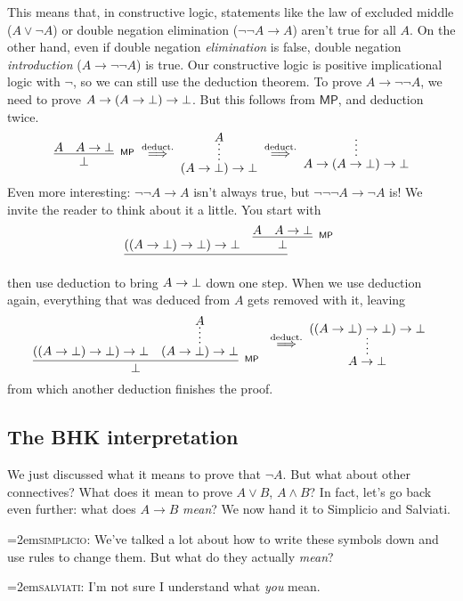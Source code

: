 \documentclass[11pt,paper=letter]{scrartcl}
\renewcommand{\sf}{\mathsf}
\renewcommand{\land}{\wedge}
\renewcommand{\lor}{\vee}
\renewcommand{\lnot}{\neg}
\newcommand{\vc}[1]{\vcenter{\hbox{#1}}}
\newcommand{\simp}{\vspace{0.5em}\noindent\hangindent=2em\textsc{simplicio:} }
\newcommand{\salv}{\vspace{0.5em}\noindent\hangindent=2em\textsc{salviati:} }
\begin{document}
This means that, in constructive logic, statements like the law of excluded middle ($A \lor \lnot A$) or double negation elimination ($\lnot \lnot A \to A$) aren't true for all $A$. On the other hand, even if double negation \emph{elimination} is false, double negation \emph{introduction} ($A \to \lnot\lnot A$) is true. Our constructive logic is positive implicational logic with $\lnot$, so we can still use the deduction theorem. To prove $A \to \lnot\lnot A$, we need to prove $A \to (A \to \bot) \to \bot$. But this follows from $\sf{MP}$, and deduction twice.
\begin{align*}
\vc{\infer[^\sf{MP}]
{\false}
{A & A \to \false}}
\;\overset{\text{deduct.}}{\implies}\;
\vc{\infer*
{(A \to \false) \to \false}
{A}}
\;\overset{\text{deduct.}}{\implies}\;
\vc{\infer*
{A \to (A \to \false) \to \false}
{}}
\end{align*}
Even more interesting: $\lnot\lnot A \to A$ isn't always true, but $\lnot\lnot\lnot A \to \lnot A$ is! We invite the reader to think about it a little. You start with
\begin{align*}
\vc{\infer
{\phantom{\false}}
{
((A \to \false) \to \false) \to \false
&
\infer[^\sf{MP}]
{\false}
{A & A \to \false}
}
}
\end{align*}
then use deduction to bring $A \to \bot$ down one step. When we use deduction again, everything that was deduced from $A$ gets removed with it, leaving
\begin{align*}
\vc{\infer[^\sf{MP}]
{\false}
{
((A \to \false) \to \false) \to \false
&
\infer*
{(A \to \false) \to \false}
{A}
}
}
\;\overset{\text{deduct.}}{\implies}\;
\vc{\infer*
{A \to \false}
{
((A \to \false) \to \false) \to \false
}
}
\end{align*}
from which another deduction finishes the proof.

\subsection{The BHK interpretation}

We just discussed what it means to prove that $\lnot A$. But what about other connectives? What does it mean to prove $A \lor B$, $A \land B$? In fact, let's go back even further: what does $A \to B$ \emph{mean}? We now hand it to Simplicio and Salviati.

\simp We've talked a lot about how to write these symbols down and use rules to change them. But what do they actually \emph{mean}?

\salv I'm not sure I understand what \emph{you} mean.
\end{document}
